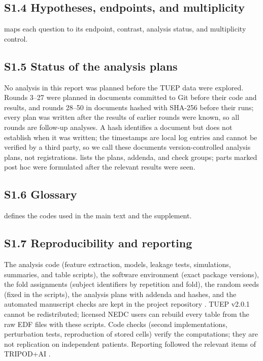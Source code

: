 \subsection*{S1.4 Hypotheses, endpoints, and multiplicity}
 maps each question to its endpoint, contrast, analysis status, and multiplicity control.


\subsection*{S1.5 Status of the analysis plans}
No analysis in this report was planned before the TUEP data were explored. Rounds 3--27 were planned in documents committed to Git before their code and results, and rounds 28--50 in documents hashed with SHA-256 before their runs; every plan was written after the results of earlier rounds were known, so all rounds are follow-up analyses. A hash identifies a document but does not establish when it was written; the timestamps are local log entries and cannot be verified by a third party, so we call these documents version-controlled analysis plans, not registrations.  lists the plans, addenda, and check groups; parts marked post hoc were formulated after the relevant results were seen.


\subsection*{S1.6 Glossary}
 defines the codes used in the main text and the supplement.


\subsection*{S1.7 Reproducibility and reporting}
The analysis code (feature extraction, models, leakage tests, simulations, summaries, and table scripts), the software environment (exact package versions), the fold assignments (subject identifiers by repetition and fold), the random seeds (fixed in the scripts), the analysis plans with addenda and hashes, and the automated manuscript checks are kept in the project repository . TUEP v2.0.1 cannot be redistributed; licensed NEDC users can rebuild every table from the raw EDF files with these scripts. Code checks (second implementations, perturbation tests, reproduction of stored cells) verify the computations; they are not replication on independent patients. Reporting followed the relevant items of TRIPOD+AI \cite{collins2024tripod}.
